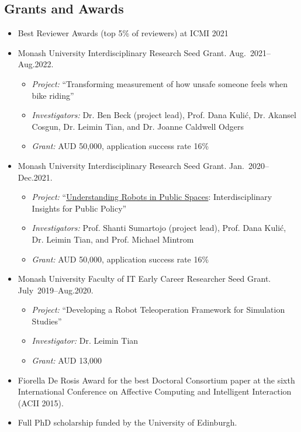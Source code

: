 \documentclass[11pt,letterpaper]{article}
\begin{document}
\subsection*{Grants and Awards}
\begin{itemize}
  \item Best Reviewer Awards (top 5\% of reviewers) at ICMI 2021
  \item Monash University Interdisciplinary Research Seed Grant. Aug.~2021--Aug.2022. 
  \begin{itemize}
    \item \emph{Project:} ``Transforming measurement of how unsafe someone feels when bike riding''
    \item \emph{Investigators:} Dr. Ben Beck (project lead), Prof. Dana Kuli{\'c}, Dr. Akansel Cosgun, Dr. Leimin Tian, and Dr. Joanne Caldwell Odgers
    \item \emph{Grant:} AUD 50,000, application success rate 16\%
  \end{itemize}
  \item Monash University Interdisciplinary Research Seed Grant. Jan.~2020--Dec.2021. 
  \begin{itemize}
    \item \emph{Project:} ``\href{https://www.monash.edu/research/better-governance-and-policy/projects-and-research/robots-in-public-space}{Understanding Robots in Public Spaces}: Interdisciplinary Insights for Public Policy''
    \item \emph{Investigators:} Prof. Shanti Sumartojo (project lead), Prof. Dana Kuli{\'c}, Dr. Leimin Tian, and Prof. Michael Mintrom
    \item \emph{Grant:} AUD 50,000, application success rate 16\%
  \end{itemize}
  \item Monash University Faculty of IT Early Career Researcher Seed Grant. July~2019--Aug.2020.
  \begin{itemize}
    \item \emph{Project:} ``Developing a Robot Teleoperation Framework for Simulation Studies''
    \item \emph{Investigator:} Dr. Leimin Tian
    \item \emph{Grant:} AUD 13,000
  \end{itemize}
  \item Fiorella De Rosis Award for the best Doctoral Consortium paper at the sixth International Conference on Affective Computing and Intelligent Interaction (ACII 2015).
  \item Full PhD scholarship funded by the University of Edinburgh.
\end{itemize}
\end{document}
